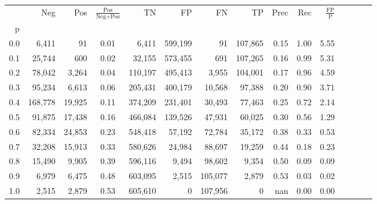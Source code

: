 \begin{tabular}{rrrcrrrrrrrrrrr}
\toprule
{} &      Neg &     Pos & $\frac{\text{Pos}}{\text{Neg}+\text{Pos}}$ &       TN &       FP &       FN &       TP &  Prec &   Rec & $\frac{\text{FP}}{\text{P}}$ \\
p   &          &         &                                            &          &          &          &          &       &       &                              \\
\midrule
0.0 &    6,411 &      91 &                                       0.01 &    6,411 &  599,199 &       91 &  107,865 &  0.15 &  1.00 &                         5.55 \\
0.1 &   25,744 &     600 &                                       0.02 &   32,155 &  573,455 &      691 &  107,265 &  0.16 &  0.99 &                         5.31 \\
0.2 &   78,042 &   3,264 &                                       0.04 &  110,197 &  495,413 &    3,955 &  104,001 &  0.17 &  0.96 &                         4.59 \\
0.3 &   95,234 &   6,613 &                                       0.06 &  205,431 &  400,179 &   10,568 &   97,388 &  0.20 &  0.90 &                         3.71 \\
0.4 &  168,778 &  19,925 &                                       0.11 &  374,209 &  231,401 &   30,493 &   77,463 &  0.25 &  0.72 &                         2.14 \\
0.5 &   91,875 &  17,438 &                                       0.16 &  466,084 &  139,526 &   47,931 &   60,025 &  0.30 &  0.56 &                         1.29 \\
0.6 &   82,334 &  24,853 &                                       0.23 &  548,418 &   57,192 &   72,784 &   35,172 &  0.38 &  0.33 &                         0.53 \\
0.7 &   32,208 &  15,913 &                                       0.33 &  580,626 &   24,984 &   88,697 &   19,259 &  0.44 &  0.18 &                         0.23 \\
0.8 &   15,490 &   9,905 &                                       0.39 &  596,116 &    9,494 &   98,602 &    9,354 &  0.50 &  0.09 &                         0.09 \\
0.9 &    6,979 &   6,475 &                                       0.48 &  603,095 &    2,515 &  105,077 &    2,879 &  0.53 &  0.03 &                         0.02 \\
1.0 &    2,515 &   2,879 &                                       0.53 &  605,610 &        0 &  107,956 &        0 &   nan &  0.00 &                         0.00 \\
\bottomrule
\end{tabular}
